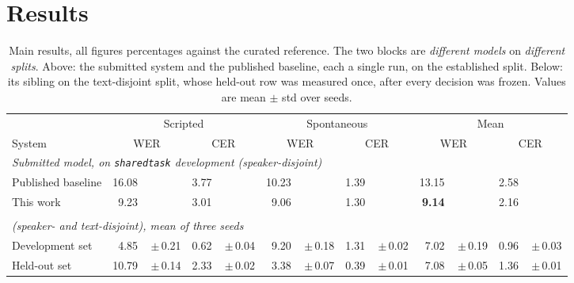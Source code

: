 \section{Results}
\label{sec:results}

\begin{table}[tb]
\centering\small
\caption{Main results, all figures percentages against the curated reference.
The two blocks are \emph{different models} on \emph{different splits}. Above:
the submitted system and the published baseline, each a single run, on the
established split. Below: its sibling on the text-disjoint split, whose
held-out row was measured once, after every decision was frozen. Values are mean
$\pm$ std over seeds.}
\label{tab:main}
\newcommand{\sd}[1]{\,$\pm$\,#1}
\begin{tabular}{l r@{}l r@{}l r@{}l r@{}l r@{}l r@{}l}
\toprule
& \multicolumn{4}{c}{Scripted} & \multicolumn{4}{c}{Spontaneous} & \multicolumn{4}{c}{Mean} \\
\cmidrule(lr){2-5}\cmidrule(lr){6-9}\cmidrule(lr){10-13}
System & \multicolumn{2}{c}{WER} & \multicolumn{2}{c}{CER}
       & \multicolumn{2}{c}{WER} & \multicolumn{2}{c}{CER}
       & \multicolumn{2}{c}{WER} & \multicolumn{2}{c}{CER} \\
\midrule
\multicolumn{13}{l}{\emph{Submitted model, on \texttt{sharedtask} development (speaker-disjoint)}} \\
\hspace{0.45em}Published baseline & 16.08 && 3.77 && 10.23 && 1.39 && 13.15 && 2.58 & \\
\hspace{0.45em}This work & 9.23 && 3.01 && 9.06 && 1.30 && \textbf{9.14} && 2.16 & \\
\addlinespace
\multicolumn{13}{l}{\emph{Sibling model, trained and measured on \texttt{sharedtask\_both}}} \\
\multicolumn{13}{l}{\emph{(speaker- and text-disjoint), mean of three seeds}} \\
\hspace{0.45em}Development set & 4.85 &\sd{0.21} & 0.62 &\sd{0.04} & 9.20 &\sd{0.18}
       & 1.31 &\sd{0.02} & 7.02 &\sd{0.19} & 0.96 &\sd{0.03} \\
\hspace{0.45em}Held-out set & 10.79 &\sd{0.14} & 2.33 &\sd{0.02} & 3.38 &\sd{0.07}
       & 0.39 &\sd{0.01} & 7.08 &\sd{0.05} & 1.36 &\sd{0.01} \\
\bottomrule
\end{tabular}
\end{table}

